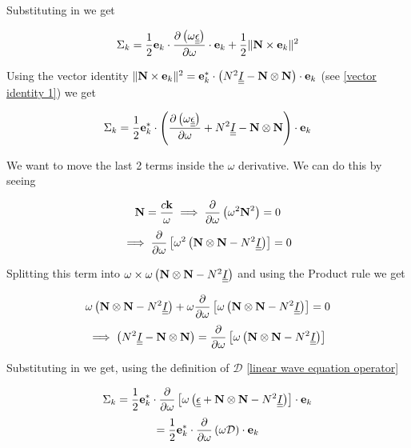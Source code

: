 Substituting in we get

\begin{equation}
	\Sigma_k = \frac{1}{2} \textbf{e}_k \cdot \frac{\partial \left( \omega \underline{\underline{\epsilon}} \right)}{\partial \omega} \cdot \textbf{e}_k + \frac{1}{2} \|\textbf{N} \times \textbf{e}_k\|^2
\end{equation}

Using the vector identity $\|\textbf{N} \times \textbf{e}_k\|^2 = \textbf{e}_k^* \cdot \left( N^2 \underline{\underline{I}} - \textbf{N} \otimes \textbf{N} \right) \cdot \textbf{e}_k$ (see \ref{vector identity 1}) we get

\begin{equation}
	\Sigma_k = \frac{1}{2} \textbf{e}_k^* \cdot \left( \frac{\partial \left( \omega \underline{\underline{\epsilon}} \right)}{\partial \omega} + N^2 \underline{\underline{I}} - \textbf{N} \otimes \textbf{N} \right) \cdot \textbf{e}_k
\end{equation}

We want to move the last 2 terms inside the $\omega$ derivative. We can do this by seeing

\begin{equation*}
	\textbf{N} = \frac{c \textbf{k}}{\omega} \implies \frac{\partial}{\partial \omega} \left( \omega^2 \textbf{N}^2 \right) = 0
\end{equation*}
\begin{equation}
	\implies \frac{\partial}{\partial \omega} \left[ \omega^2 \left( \textbf{N} \otimes \textbf{N} - N^2 \underline{\underline{I}} \right) \right] = 0
\end{equation}

Splitting this term into $\omega \times \omega \left( \textbf{N} \otimes \textbf{N} - N^2 \underline{\underline{I}} \right)$ and using the Product rule we get

\begin{equation*}
	\omega \left( \textbf{N} \otimes \textbf{N} - N^2 \underline{\underline{I}} \right) + \omega \frac{\partial}{\partial \omega} \left[ \omega \left( \textbf{N} \otimes \textbf{N} - N^2 \underline{\underline{I}} \right) \right] = 0
\end{equation*}
\begin{equation}
	\implies \left( N^2 \underline{\underline{I}} - \textbf{N} \otimes \textbf{N} \right) = \frac{\partial}{\partial \omega} \left[ \omega \left( \textbf{N} \otimes \textbf{N} - N^2 \underline{\underline{I}} \right) \right]
\end{equation}

Substituting in we get, using the definition of $\mathcal{D}$ \eqref{linear wave equation operator}

\begin{equation*}
	\Sigma_k = \frac{1}{2} \textbf{e}_k^* \cdot \frac{\partial}{\partial \omega} \left[ \omega \left( \underline{\underline{\epsilon}} + \textbf{N} \otimes \textbf{N} - N^2 \underline{\underline{I}} \right) \right] \cdot \textbf{e}_k
\end{equation*}
\begin{equation}
	= \frac{1}{2} \textbf{e}_k^* \cdot \frac{\partial}{\partial \omega} \left( \omega \mathcal{D} \right) \cdot \textbf{e}_k
\end{equation}

